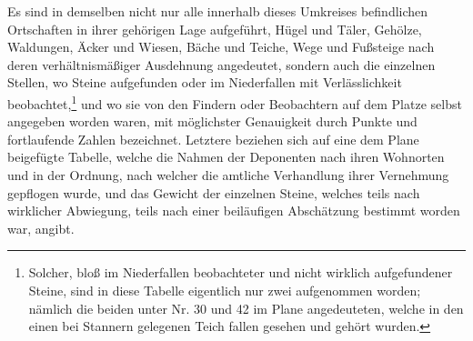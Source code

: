\documentclass[a4paper, 11pt, oneside, german]{article}
\begin{document}
Es sind in demselben nicht nur alle innerhalb dieses Umkreises befindlichen Ortschaften in ihrer gehörigen Lage aufgeführt, Hügel und Täler, Gehölze, Waldungen, Äcker und Wiesen, Bäche und Teiche, Wege und Fußsteige nach deren verhältnismäßiger Ausdehnung angedeutet, sondern auch die einzelnen Stellen, wo Steine aufgefunden oder im Niederfallen mit Verlässlichkeit beobachtet,\footnote{Solcher, bloß im Niederfallen beobachteter und nicht wirklich aufgefundener Steine, sind in diese Tabelle eigentlich nur zwei aufgenommen worden; nämlich die beiden unter Nr. 30 und 42 im Plane angedeuteten, welche in den einen bei Stannern gelegenen Teich fallen gesehen und gehört wurden.} und wo sie von den Findern oder Beobachtern auf dem Platze selbst angegeben worden waren, mit möglichster Genauigkeit durch Punkte und fortlaufende Zahlen bezeichnet. Letztere beziehen sich auf eine dem Plane beigefügte Tabelle, welche die Nahmen der Deponenten nach ihren Wohnorten und in der Ordnung, nach welcher die amtliche Verhandlung ihrer Vernehmung gepflogen wurde, und das Gewicht der einzelnen Steine, welches teils nach wirklicher Abwiegung, teils nach einer beiläufigen Abschätzung bestimmt worden war, angibt.
\end{document}
